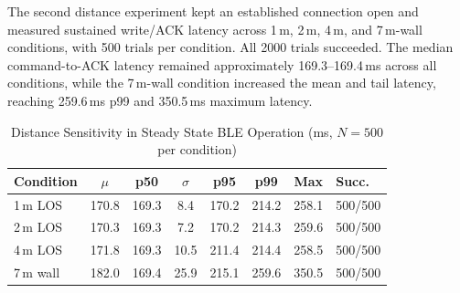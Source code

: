 \documentclass[journal]{IEEEtran}
\begin{document}
\begin{table}[!t]
\renewcommand{\arraystretch}{1.12}
\caption{Distance Sensitivity with Full Reconnect per Trial (ms, $N=200$ per condition)}
\label{tab:distance_latency}
\centering
{}
\end{table}
The second distance experiment kept an established connection open and measured sustained write/ACK latency across 1\,m, 2\,m, 4\,m, and 7\,m-wall conditions, with 500 trials per condition. All 2000 trials succeeded. The median command-to-ACK latency remained approximately 169.3--169.4\,ms across all conditions, while the 7\,m-wall condition increased the mean and tail latency, reaching 259.6\,ms p99 and 350.5\,ms maximum latency.

\begin{table}[!t]
\renewcommand{\arraystretch}{1.12}
\setlength{\tabcolsep}{3.5pt} 
\caption{Distance Sensitivity in Steady State BLE Operation (ms, $N=500$ per condition)}
\label{tab:distance_steady}
\centering
\scriptsize
\begin{tabular}{lccccccl}
\toprule
\textbf{Condition} & $\mu$ & \textbf{p50} & $\sigma$ & \textbf{p95} & \textbf{p99} & \textbf{Max} & \textbf{Succ.} \\
\midrule
1\,m LOS & 170.8 & 169.3 & 8.4 & 170.2 & 214.2 & 258.1 & 500/500 \\
2\,m LOS & 170.3 & 169.3 & 7.2 & 170.2 & 214.3 & 259.6 & 500/500 \\
4\,m LOS & 171.8 & 169.3 & 10.5 & 211.4 & 214.4 & 258.5 & 500/500 \\
7\,m wall & 182.0 & 169.4 & 25.9 & 215.1 & 259.6 & 350.5 & 500/500 \\
\bottomrule
\end{tabular}
\end{table}
\end{document}
